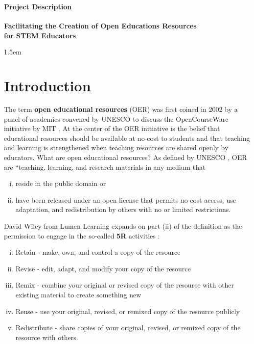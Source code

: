 \documentclass[11pt]{article}
\begin{document}
\begin{center}
\textbf{\Large Project Description}\\[0.25cm]
\hrulefill\\[0.25cm]
\textbf{\Large Facilitating the Creation of Open Educations Resources \\[1ex] for STEM Educators}\\
\hrulefill
\end{center}
\baselineskip 1.5em

\section{Introduction}
The term \textbf{open educational resources} (OER) was first coined in 2002 by a panel of academics convened by UNESCO to discuss the OpenCourseWare initiative by MIT \cite{oerguidelines}.  At the center of the OER initiative is the belief that educational resources should be available at no-cost to students and that teaching and learning is strengthened when teaching resources are shared openly by educators. What are open educational resources?  As defined by UNESCO \cite{oerworldcongress}, OER are ``teaching, learning, and research materials in any medium that
\begin{enumerate}[(i)]
\item reside in the public domain or
\item have been released under an open license that permits no-cost access, use adaptation, and redistribution by others with no or limited restrictions.
\end{enumerate}
David Wiley from Lumen Learning expands on part (ii) of the definition as the permission to engage in the so-called \textbf{5R} activities \cite{wileynd}:
\begin{enumerate}[(i)]
  \item Retain - make, own, and control a copy of the resource
  \item Revise - edit, adapt, and modify your copy of the resource
  \item Remix - combine your original or revised copy of the resource with other existing material to create something new
  \item Reuse - use your original, revised, or remixed copy of the resource publicly
  \item Redistribute - share copies of your original, revised, or remixed copy of the resource with others.
\end{enumerate}
\end{document}
